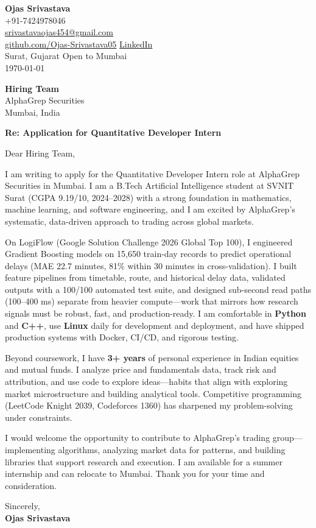 \documentclass[a4paper,11pt]{article}
\begin{document}
\begin{flushright}
\textbf{Ojas Srivastava} \\
+91-7424978046 \\
\href{mailto:srivastavaojas454@gmail.com}{srivastavaojas454@gmail.com} \\
\href{https://github.com/Ojas-Srivastava05}{github.com/Ojas-Srivastava05} \textbar{}
\href{https://linkedin.com/in/ojas-srivastava05}{LinkedIn} \\
Surat, Gujarat \textbar{} Open to Mumbai \\
\today
\end{flushright}

\vspace{4mm}
\textbf{Hiring Team} \\
AlphaGrep Securities \\
Mumbai, India

\vspace{2mm}
\textbf{Re: Application for Quantitative Developer Intern}

Dear Hiring Team,

I am writing to apply for the Quantitative Developer Intern role at AlphaGrep Securities in Mumbai. I am a B.Tech Artificial Intelligence student at SVNIT Surat (CGPA 9.19/10, 2024--2028) with a strong foundation in mathematics, machine learning, and software engineering, and I am excited by AlphaGrep's systematic, data-driven approach to trading across global markets.

On LogiFlow (Google Solution Challenge 2026 Global Top 100), I engineered Gradient Boosting models on 15,650 train-day records to predict operational delays (MAE 22.7 minutes, 81\% within 30 minutes in cross-validation). I built feature pipelines from timetable, route, and historical delay data, validated outputs with a 100/100 automated test suite, and designed sub-second read paths (100--400 ms) separate from heavier compute---work that mirrors how research signals must be robust, fast, and production-ready. I am comfortable in \textbf{Python} and \textbf{C++}, use \textbf{Linux} daily for development and deployment, and have shipped production systems with Docker, CI/CD, and rigorous testing.

Beyond coursework, I have \textbf{3+ years} of personal experience in Indian equities and mutual funds. I analyze price and fundamentals data, track risk and attribution, and use code to explore ideas---habits that align with exploring market microstructure and building analytical tools. Competitive programming (LeetCode Knight 2039, Codeforces 1360) has sharpened my problem-solving under constraints.

I would welcome the opportunity to contribute to AlphaGrep's trading group---implementing algorithms, analyzing market data for patterns, and building libraries that support research and execution. I am available for a summer internship and can relocate to Mumbai. Thank you for your time and consideration.

Sincerely, \\
\vspace{8mm}
\textbf{Ojas Srivastava}
\end{document}
